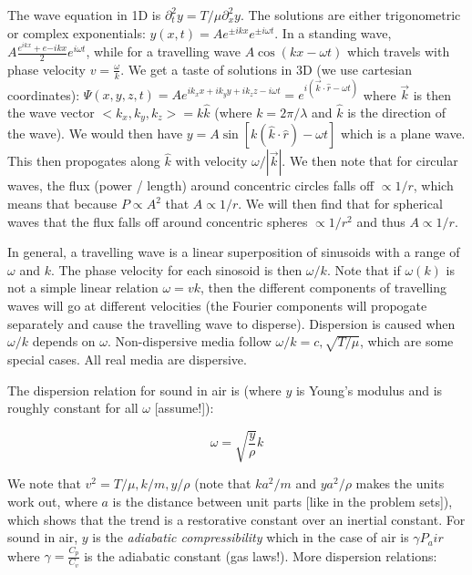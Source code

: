 \documentclass{report}
\begin{document}
The wave equation in 1D is $\partial_t^2 y = T/\mu \partial_x^2 y$. The solutions are either trigonometric or complex exponentials: $y(x,t) = Ae^{\pm ikx}e^{\pm i\omega t}$. In a standing wave, $A\frac{e^{ikx} + e{-ikx}}{2}e^{i\omega t}$, while for a travelling wave $A\cos(kx - \omega t)$ which travels with phase velocity $v = \frac{\omega}{k}$. We get a taste of solutions in 3D (we use cartesian coordinates): $\Psi(x,y,z,t) = Ae^{ik_xx + ik_yy + ik_zz - i\omega t} = e^{i(\vec{k} \cdot \hat{r} - \omega t)}$ where $\vec{k}$ is then the wave vector $<k_x, k_y, k_z> = k\hat{k}$ (where $k = 2\pi/\lambda$ and $\hat{k}$ is the direction of the wave). We would then have $y = A\sin[k(\hat{k}\cdot \hat{r}) - \omega t]$ which is a plane wave. This then propogates along $\hat{k}$ with velocity $\omega/|\vec{k}|$. We then note that for circular waves, the flux (power / length) around concentric circles falls off $\propto 1/r$, which means that because $P \propto A^2$ that $A \propto 1/r$. We will then find that for spherical waves that the flux falls off around concentric spheres $\propto 1/r^2$ and thus $A \propto 1/r$. 

In general, a travelling wave is a linear superposition of sinusoids with a range of $\omega$ and $k$. The phase velocity for each sinosoid is then $\omega/k$. Note that if $\omega(k)$ is not a simple linear relation $\omega = vk$, then the different components of travelling waves will go at different velocities (the Fourier components will propogate separately and cause the travelling wave to disperse). Dispersion is caused when $\omega/k$ depends on $\omega$. Non-dispersive media follow $\omega/k = c, \sqrt{T/\mu}$, which are some special cases. All real media are dispersive. 

The dispersion relation for sound in air is (where $y$ is Young's modulus and is roughly constant for all $\omega$ [assume!]):

$$\omega = \sqrt{\frac{y}{\rho}}k$$

We note that $v^2 = T/\mu, k/m, y/\rho$ (note that $ka^2/m$ and $ya^2/\rho$ makes the units work out, where $a$ is the distance between unit parts [like in the problem sets]), which shows that the trend is a restorative constant over an inertial constant. For sound in air, $y$ is the \emph{adiabatic compressibility} which in the case of air is $\gamma P_air$ where $\gamma = \frac{C_p}{C_v}$ is the adiabatic constant (gas laws!). More dispersion relations:
\end{document}
